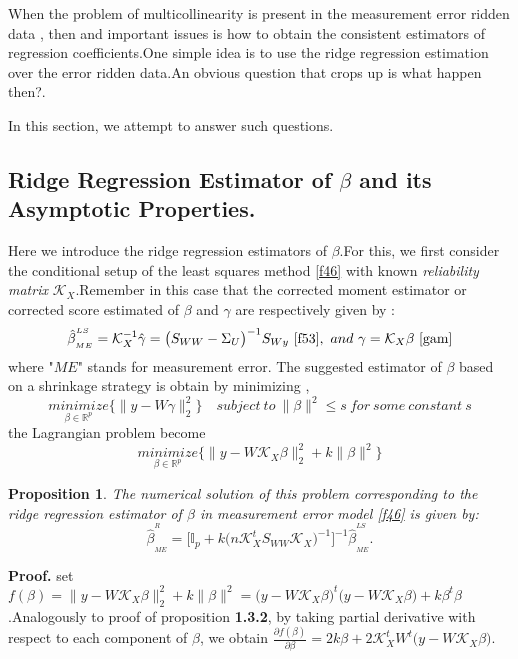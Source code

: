 \documentclass[12pt]{report}
\newtheorem {proposition}{Proposition}[section]  %
\begin{document}
When the problem of multicollinearity is present in the measurement error ridden data , then and important issues is how to obtain the consistent estimators of regression coefficients.One simple idea is to use the ridge regression estimation over the error ridden data.An obvious question that crops up is what happen then?.

In this section, we attempt to answer such questions.
\subsection{Ridge Regression Estimator of $\beta$ and its Asymptotic Properties.}
Here we introduce the ridge regression estimators of $\beta$.For this, we first consider the conditional setup of the least squares method \ref{f46} with known \textit{reliability matrix} $\mathcal{K}_{X}$.Remember in this case that the corrected moment estimator or corrected score estimated of $\beta$  and $\gamma$ are respectively given by :
$$ \hat{\beta}^{^{LS}}_{_{ME}}=\mathcal{K}_{X}^{-1}\hat{\gamma}=\big(S_{WW}-\Sigma_{U}\big)^{-1}S_{Wy}\ \eqref{f53} , \ and\ \gamma=\mathcal{K}_{X}\beta\ \eqref{gam}$$
where "\textbf{$ME$}" stands for measurement error.
The suggested estimator of $\beta$ based on a shrinkage strategy is obtain by minimizing ,
\begin{equation}
\underset{\beta \in \mathbb{R}^{p}}{minimize} \bigg\{\parallel y- W\gamma \parallel^{2}_{2}\bigg\} \quad subject\ to\ \parallel \beta \parallel^{2}\leq s\ for\ some\ constant\ s
	\label{f56}
\end{equation}
the Lagrangian problem become
\begin{equation}
	\underset{\beta \in \mathbb{R}^{p}}{minimize} \bigg\{ \parallel y- W\mathcal{K}_{X}\beta \parallel^{2}_{2}+k\parallel \beta \parallel^{2}\bigg\}
	\label{f57}
\end{equation} 
\begin{proposition}
	The numerical solution of this problem corresponding to the ridge regression estimator of $\beta$ in measurement error model \ref{f46} is given by:
	\begin{equation}
		\hat{\beta}^{^{R}}_{_{ME}}=\bigg[\mathbb{I}_{p}+k\big(n\mathcal{K}_{X}^{t}S_{WW}\mathcal{K}_{X}\big)^{-1}\bigg]^{-1}\hat{\beta}^{^{LS}}_{_{ME}}.
		\label{f58}
	\end{equation}
\end{proposition}
\textbf{Proof.}  set $f(\beta)=\parallel y- W\mathcal{K}_{X}\beta \parallel^{2}_{2}+k\parallel \beta \parallel^{2}=\big( y- W\mathcal{K}_{X}\beta\big)^{t}\big( y- W\mathcal{K}_{X}\beta\big)+k\beta^{t}\beta$.Analogously to proof of proposition \textbf{1.3.2}, by taking partial derivative with respect to each component of $\beta$, we obtain $\frac{\partial f(\beta)}{\partial \beta}=2k\beta +2\mathcal{K}_{X}^{t}W^{t}\big(y-W\mathcal{K}_{X}\beta\big)$.
\end{document}
